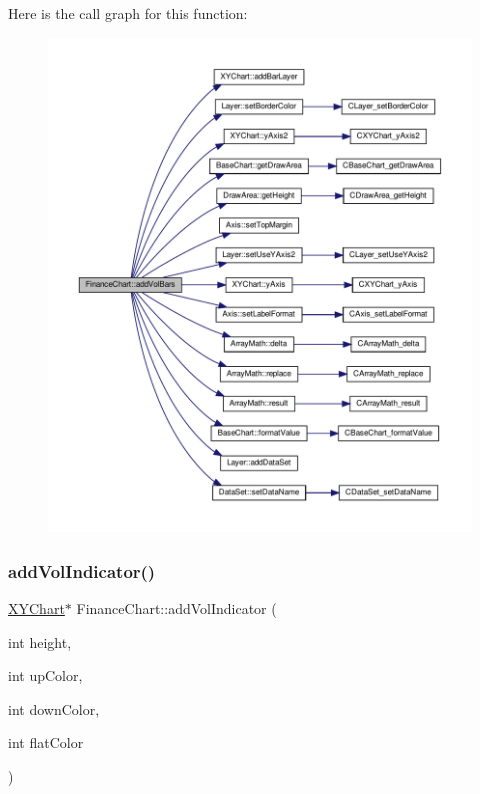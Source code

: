 Here is the call graph for this function\+:
\nopagebreak
\begin{figure}[H]
\begin{center}
\leavevmode
\includegraphics[width=350pt]{class_finance_chart_aa1405175c2d8761adcf41c5529ef4613_cgraph}
\end{center}
\end{figure}
\mbox{\label{class_finance_chart_a51ceb77140f73f49707d526dafe643fe}} 
\subsubsection{\texorpdfstring{add\+Vol\+Indicator()}{addVolIndicator()}}
{\footnotesize\ttfamily \hyperlink{class_x_y_chart}{X\+Y\+Chart}$\ast$ Finance\+Chart\+::add\+Vol\+Indicator (\begin{DoxyParamCaption}\item[{int}]{height,  }\item[{int}]{up\+Color,  }\item[{int}]{down\+Color,  }\item[{int}]{flat\+Color }\end{DoxyParamCaption})\hspace{0.3cm}{\ttfamily [inline]}}



